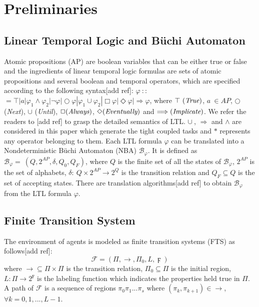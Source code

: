 \documentclass[journal]{IEEEtran}
\begin{document}
\section{Preliminaries}
\subsection{Linear Temporal Logic and B\"{u}chi Automaton}
Atomic propositions (AP) are boolean variables that can be either true or false and the ingredients of linear temporal logic formulas are sets of atomic propositions and several boolean and temporal operators, which are specified according to the following syntax[add ref]: $\varphi\ $$:$$:$$=\top|a|\varphi_1\wedge\varphi_2| \neg \varphi|\bigcirc\varphi|\varphi_1\cup\varphi_2|\Box\varphi|\Diamond\varphi|\Longrightarrow\varphi$, where $\top\ (\emph{True})$, $a\ \in AP$, $\bigcirc$ (\emph{Next}), $\cup$ (\emph{Until}), $\Box (\emph{Always})$,  $\Diamond (\emph{Eventually})$ and $\Longrightarrow (\emph{Implicate})$. We refer the readers to [add ref] to grasp the detailed semantics of LTL. $\cup\ $, $\Longrightarrow$ and $\wedge$ are considered in this paper which generate the tight coupled tasks and $\ast$ represents any operator belonging to them.
Each LTL formula $\varphi$ can be translated into a Nondeterministic B\"{u}chi Automaton (NBA) $\mathcal{B}_\varphi$. It is defined as $\mathcal{B}_\varphi=\ (Q,2^{AP},\delta,Q_0,Q_F)$, where $Q$ is the finite set of all the states of $\mathcal{B}_\varphi$, $2^{AP}$ is the set of alphabets, $\delta:\ Q\times 2^{AP}\rightarrow 2^Q$ is the transition relation and $Q_F \subseteq Q$ is the set of accepting states. There are translation algorithms[add ref] to obtain $\mathcal{B}_\varphi$ from the LTL formula $\varphi$.
\subsection{Finite Transition System}
The environment of agents is modeled as finite transition systems (FTS) as follows[add ref]:
$$\mathcal{F}=(\Pi,\rightarrow,\Pi_0,L,\digamma)$$
where $\rightarrow \subseteq \Pi \times \Pi$ is the transition relation, $\Pi_0 \subseteq \Pi$ is the initial region, $L:\Pi\rightarrow 2^{\digamma}$ is the labeling function which indicates the properties held true in $\Pi$. A path of $\mathcal{F}$ is a sequence of regions $\pi_0 \pi_1 ...\pi_s$ where $(\pi_k,\pi_{k+1})\in \rightarrow$, $\forall k=0,1,...,L-1$.
\end{document}
